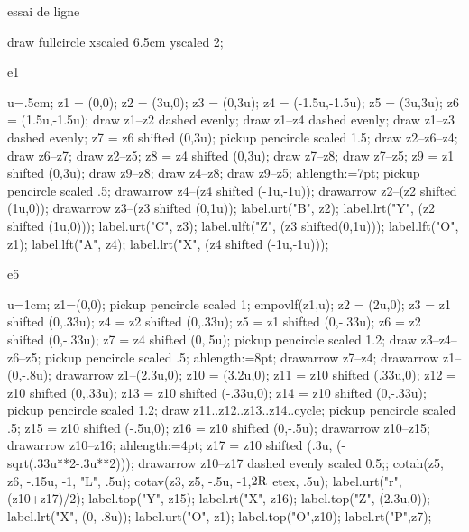 \documentclass[12pt,a4paper,twocolumn]{book} %
\begin{document}
essai de ligne


\begin{mpdisplay}
draw fullcircle xscaled 6.5cm yscaled 2\mpdim\baselineskip;
\end{mpdisplay}
e1
\begin{mpdisplay}
u=.5cm;
z1 = (0,0);
z2 = (3u,0);
z3 = (0,3u);
z4 = (-1.5u,-1.5u);
z5 = (3u,3u);
z6 = (1.5u,-1.5u);
draw z1--z2 dashed evenly;
draw z1--z4 dashed evenly;
draw z1--z3 dashed evenly;
z7 = z6 shifted (0,3u);
pickup pencircle scaled 1.5;
draw z2--z6--z4;
draw z6--z7;
draw z2--z5;
z8 = z4 shifted (0,3u);
draw z7--z8;
draw z7--z5;
z9 = z1 shifted (0,3u);
draw z9--z8;
draw z4--z8;
draw z9--z5;
ahlength:=7pt;
pickup pencircle scaled .5;
drawarrow z4--(z4 shifted (-1u,-1u));
drawarrow z2--(z2 shifted (1u,0));
drawarrow z3--(z3 shifted (0,1u));
label.urt("B", z2);
label.lrt("Y", (z2 shifted (1u,0)));
label.urt("C", z3);
label.ulft("Z", (z3 shifted(0,1u)));
label.lft("O", z1);
label.lft("A", z4);
label.lrt("X", (z4 shifted (-1u,-1u)));
\end{mpdisplay}
e5
\begin{mpdisplay}
  u=1cm;
  z1=(0,0);
  pickup pencircle scaled 1;
  empovlf(z1,u);
  z2 = (2u,0);
  z3 = z1 shifted (0,.33u);
  z4 = z2 shifted (0,.33u);
  z5 = z1 shifted (0,-.33u);
  z6 = z2 shifted (0,-.33u);
  z7 = z4 shifted (0,.5u);
  pickup pencircle scaled 1.2;
  draw z3--z4--z6--z5;
  pickup pencircle scaled .5;
  ahlength:=8pt;
  drawarrow z7--z4;
  drawarrow z1--(0,-.8u);
  drawarrow z1--(2.3u,0);
  z10 = (3.2u,0);
  z11 = z10 shifted (.33u,0);
  z12 = z10 shifted (0,.33u);
  z13 = z10 shifted (-.33u,0);
  z14 = z10 shifted (0,-.33u);
  pickup pencircle scaled 1.2;
  draw z11..z12..z13..z14..cycle;
  pickup pencircle scaled .5;
  z15 = z10 shifted (-.5u,0);
  z16 = z10 shifted (0,-.5u);
  drawarrow z10--z15;
  drawarrow z10--z16;
  ahlength:=4pt;
  z17 = z10 shifted (.3u, (-sqrt(.33u**2-.3u**2)));
  drawarrow z10--z17 dashed evenly scaled 0.5;;
  cotah(z5, z6, -.15u, -1, "L", .5u);
  cotav(z3, z5, -.5u, -1,\btex $\rm 2R$ etex, .5u);
  label.urt("r", (z10+z17)/2);
  label.top("Y", z15);
  label.rt("X", z16);
  label.top("Z", (2.3u,0));
  label.lrt("X", (0,-.8u));
  label.urt("O", z1);
  label.top("O",z10);
  label.rt("P",z7);
\end{mpdisplay}
\end{document}
